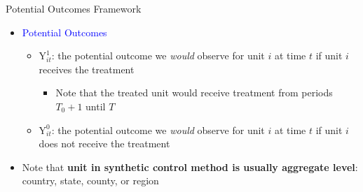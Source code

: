 \documentclass[hyperref={pdfpagelabels=false}]{beamer}
\begin{document}
\begin{frame}{Potential Outcomes Framework}{}
\begin{itemize}
\item \textcolor{blue}{Potential Outcomes}
\vspace{0.2cm}
\begin{itemize}
\item $\mathrm{Y}^{1}_{it}$: the potential outcome we \textit{would} observe for unit $i$ at time $t$ if unit $i$ receives the treatment 
\vspace{0.2cm}
\begin{itemize}
\item Note that the treated unit would receive treatment from periods $T_0+1$ until $T$
\end{itemize}
\vspace{0.2cm}
\item $\mathrm{Y}^{0}_{it}$: the potential outcome we \textit{would} observe for unit $i$ at time $t$ if unit $i$ does not receive the treatment
\end{itemize}
\vspace{0.2cm}
\item Note that \textbf{unit in synthetic control method is usually aggregate level}: country, state, county, or region 



\end{itemize}
\end{frame}
\end{document}
